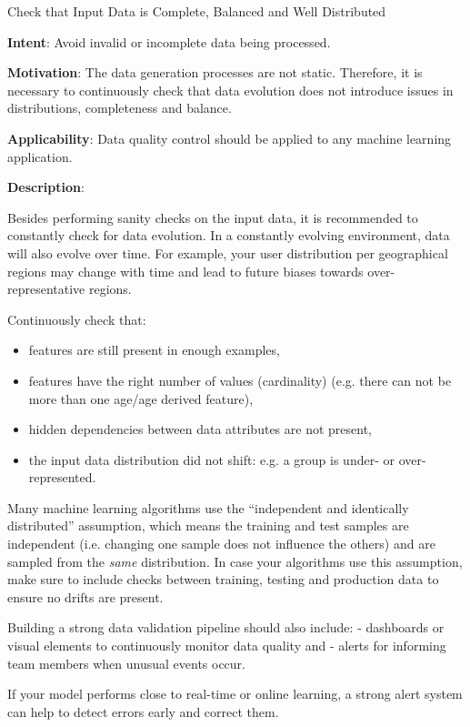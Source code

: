   
  \begin{frame}[plain]{ Check that Input Data is Complete, Balanced and Well Distributed
 }

  \textbf{Intent}: Avoid invalid or incomplete data being processed. 
 

  \textbf{Motivation}: The data generation processes are not static. Therefore, it is necessary to continuously check that data evolution does not introduce issues in distributions, completeness and balance. 
 

  \textbf{Applicability}: Data quality control should be applied to any machine learning application.
 

  \textbf{Description}: 

Besides performing sanity checks on the input data, it is recommended to constantly check for data evolution. In a constantly evolving environment, data will also evolve over time.
For example, your user distribution per geographical regions may change with time and lead to future biases towards over-representative regions.


Continuously check that:


\begin{itemize}

  \item features are still present in enough examples,

  \item features have the right number of values (cardinality) (e.g. there can not be more than one age/age derived feature),

  \item hidden dependencies between data attributes are not present,

  \item the input data distribution did not shift: e.g. a group is under- or over-represented.

\end{itemize}


Many machine learning algorithms use the ``independent and identically distributed'' assumption, which means the training and test samples are independent (i.e. changing one sample does not influence the others) and are sampled from the \emph{same} distribution.
In case your algorithms use this assumption, make sure to include checks between training, testing and production data to ensure no drifts are present.


Building a strong data validation pipeline should also include:
- dashboards or visual elements to continuously monitor data quality and
- alerts for informing team members when unusual events occur.


If your model performs close to real-time or online learning, a strong alert system can help to detect errors early and correct them.


 


  \end{frame}

